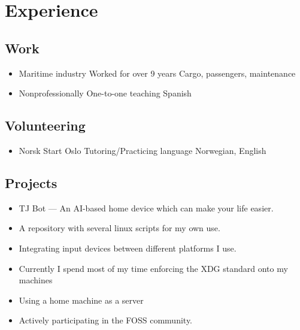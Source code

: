 \documentclass{curriculum}
\begin{document}
	\section{Experience}	
	\begin{half}
	\subsection{Work}
		\begin{itemize}
		\item Maritime industry
			\subitem Worked for over 9 years
			\subitem Cargo, passengers, maintenance
		\item Nonprofessionally
			\subitem One-to-one teaching
			\subitem Spanish
		\end{itemize}
	\subsection{Volunteering}
		\begin{itemize}
			\item Norsk Start Oslo
				\subitem Tutoring/Practicing language
				\subitem Norwegian, English 
		\end{itemize}
	\end{half}
	\begin{half}
	\subsection{Projects}
		\begin{itemize}
			\item TJ Bot --- An AI-based home device which can make your life easier.
			\item A repository with several linux scripts for my own use.
			\item Integrating input devices between different platforms I use.
			\item Currently I spend most of my time enforcing the XDG standard onto my machines
			\item Using a home machine as a server
			\item Actively participating in the FOSS community.
		\end{itemize}
	\end{half}
\end{document}

